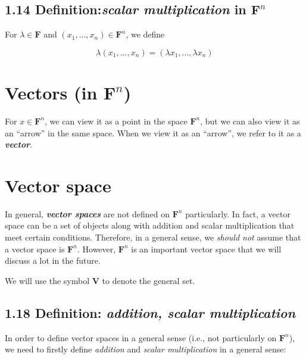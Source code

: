 \documentclass[12pt, letterpaper, oneside]{book}
\begin{document}
\subsection{
  1.14 Definition:\textbf{\textit{scalar multiplication}} in $\mathbf{F}^n$
}

For $\lambda \in \mathbf{F}$ and $(x_1, ..., x_n) \in \mathbf{F}^n$, we define

\[
  \lambda(x_1, ..., x_n) = (\lambda x_1, ..., \lambda x_n)
\]

\section{Vectors (in $\mathbf{F}^n$)}

For $x \in \mathbf{F}^n$, we can view it as a point in the space $\mathbf{F}^n$,
but we can also view it as an ``arrow'' in the same space. When we view it as
an ``arrow'', we refer to it as a \textbf{\textit{vector}}.

\section{Vector space}

In general, \textbf{\textit{vector spaces}} are not defined on $\mathbf{F}^n$
particularly. In fact, a vector space can be a set of objects along with
addition and scalar multiplication that meet certain conditions. Therefore, in
a general sense, we \textit{should not} assume that a vector space is
$\mathbf{F}^n$. However, $\mathbf{F}^n$ is an important vector space that we
will discuss a lot in the future.

We will use the symbol $\mathbf{V}$ to denote the general set.

\subsection{1.18 Definition: \it{addition}, \it{scalar multiplication}}

In order to define vector spaces in a general sense (i.e., not particularly on
$\mathbf{F}^n$), we need to firstly define \textit{addition} and \textit{scalar
multiplication} in a general sense:
\end{document}
